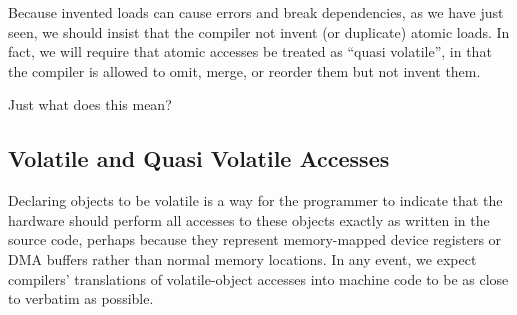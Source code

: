 Because invented loads can cause errors and break dependencies,
as we have just seen, we should insist that
the compiler not invent (or duplicate) atomic loads.
In fact, we will require that atomic accesses be treated as
``quasi volatile'', in that the compiler is allowed to omit,
merge, or reorder them but not invent them.

Just what does this mean?

\subsection{Volatile and Quasi Volatile Accesses}
\label{sec:Volatile and Quasi Volatile Accesses}

Declaring objects to be volatile is a way for the programmer to
indicate that the hardware should perform all accesses to these
objects exactly as written in the source code, perhaps because they
represent memory-mapped device registers or DMA buffers rather than
normal memory locations.
In any event, we expect compilers' translations of volatile-object accesses
into machine code to be as close to verbatim as possible.

